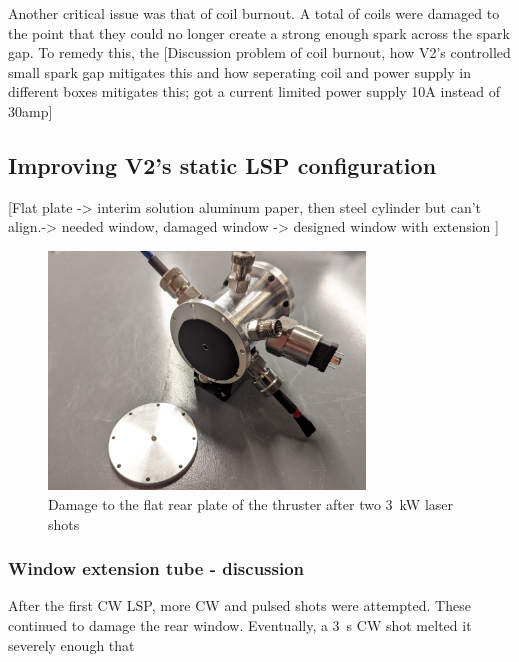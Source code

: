                 Another critical issue was that of coil burnout. A total of  coils were damaged to the point that they could no longer create a strong enough spark across the spark gap. To remedy this, the  [Discussion problem of coil burnout, how V2's controlled small spark gap mitigates this and how seperating coil and power supply in different boxes mitigates this; got a current limited power supply 10A instead of 30amp]

    \subsection{Improving V2's static LSP configuration}

        [Flat plate -> interim solution aluminum paper, then steel cylinder but can't align.-> needed window, damaged window -> designed window with extension ]

        \begin{figure}[!ht]
            \centering
            \includegraphics[width=0.75\textwidth]{assets/4 experiments/V2 test damage.jpg}
            \caption{Damage to the flat rear plate of the thruster after two \qty{3}{kW} laser shots}
        \end{figure}

        \subsubsection{Window extension tube - discussion}
        
        After the first CW LSP, more CW and pulsed shots were attempted. These continued to damage the rear window. Eventually, a \qty{3}{s} CW shot melted it severely enough that 

